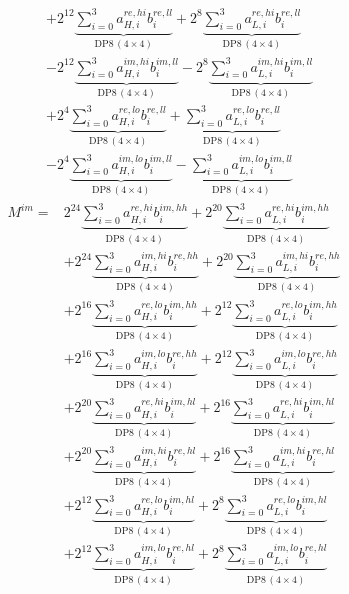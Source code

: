 \documentclass[fleqn]{article}
\newcommand{\DPop}[3]{\mathrm{DP#1}\,(#2\!\times\!#3)}
\begin{document}
\begin{align*}
  & + 2^{12}\underbrace{\sum_{i=0}^{3} a_{H,i}^{re,hi} b_i^{re,ll}}_{\DPop{8}{4}{4}} + 2^{8}\underbrace{\sum_{i=0}^{3} a_{L,i}^{re,hi} b_i^{re,ll}}_{\DPop{8}{4}{4}} \\[0.4em]
  & - 2^{12}\underbrace{\sum_{i=0}^{3} a_{H,i}^{im,hi} b_i^{im,ll}}_{\DPop{8}{4}{4}} - 2^{8}\underbrace{\sum_{i=0}^{3} a_{L,i}^{im,hi} b_i^{im,ll}}_{\DPop{8}{4}{4}} \\[0.4em]
  & + 2^{4}\underbrace{\sum_{i=0}^{3} a_{H,i}^{re,lo} b_i^{re,ll}}_{\DPop{8}{4}{4}} + \underbrace{\sum_{i=0}^{3} a_{L,i}^{re,lo} b_i^{re,ll}}_{\DPop{8}{4}{4}} \\[0.4em]
  & - 2^{4}\underbrace{\sum_{i=0}^{3} a_{H,i}^{im,lo} b_i^{im,ll}}_{\DPop{8}{4}{4}} - \underbrace{\sum_{i=0}^{3} a_{L,i}^{im,lo} b_i^{im,ll}}_{\DPop{8}{4}{4}}
\end{align*}
\begin{align*}
M^{im} = {}
  & 2^{24}\underbrace{\sum_{i=0}^{3} a_{H,i}^{re,hi} b_i^{im,hh}}_{\DPop{8}{4}{4}} + 2^{20}\underbrace{\sum_{i=0}^{3} a_{L,i}^{re,hi} b_i^{im,hh}}_{\DPop{8}{4}{4}} \\[0.4em]
  & + 2^{24}\underbrace{\sum_{i=0}^{3} a_{H,i}^{im,hi} b_i^{re,hh}}_{\DPop{8}{4}{4}} + 2^{20}\underbrace{\sum_{i=0}^{3} a_{L,i}^{im,hi} b_i^{re,hh}}_{\DPop{8}{4}{4}} \\[0.4em]
  & + 2^{16}\underbrace{\sum_{i=0}^{3} a_{H,i}^{re,lo} b_i^{im,hh}}_{\DPop{8}{4}{4}} + 2^{12}\underbrace{\sum_{i=0}^{3} a_{L,i}^{re,lo} b_i^{im,hh}}_{\DPop{8}{4}{4}} \\[0.4em]
  & + 2^{16}\underbrace{\sum_{i=0}^{3} a_{H,i}^{im,lo} b_i^{re,hh}}_{\DPop{8}{4}{4}} + 2^{12}\underbrace{\sum_{i=0}^{3} a_{L,i}^{im,lo} b_i^{re,hh}}_{\DPop{8}{4}{4}} \\[0.4em]
  & + 2^{20}\underbrace{\sum_{i=0}^{3} a_{H,i}^{re,hi} b_i^{im,hl}}_{\DPop{8}{4}{4}} + 2^{16}\underbrace{\sum_{i=0}^{3} a_{L,i}^{re,hi} b_i^{im,hl}}_{\DPop{8}{4}{4}} \\[0.4em]
  & + 2^{20}\underbrace{\sum_{i=0}^{3} a_{H,i}^{im,hi} b_i^{re,hl}}_{\DPop{8}{4}{4}} + 2^{16}\underbrace{\sum_{i=0}^{3} a_{L,i}^{im,hi} b_i^{re,hl}}_{\DPop{8}{4}{4}} \\[0.4em]
  & + 2^{12}\underbrace{\sum_{i=0}^{3} a_{H,i}^{re,lo} b_i^{im,hl}}_{\DPop{8}{4}{4}} + 2^{8}\underbrace{\sum_{i=0}^{3} a_{L,i}^{re,lo} b_i^{im,hl}}_{\DPop{8}{4}{4}} \\[0.4em]
  & + 2^{12}\underbrace{\sum_{i=0}^{3} a_{H,i}^{im,lo} b_i^{re,hl}}_{\DPop{8}{4}{4}} + 2^{8}\underbrace{\sum_{i=0}^{3} a_{L,i}^{im,lo} b_i^{re,hl}}_{\DPop{8}{4}{4}} \\[0.4em]

\end{align*}
\end{document}
